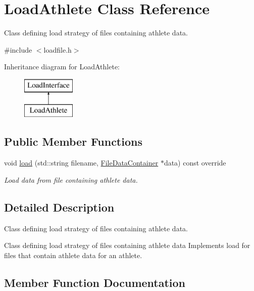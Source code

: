 \hypertarget{classLoadAthlete}{}\section{Load\+Athlete Class Reference}
\label{classLoadAthlete}


Class defining load strategy of files containing athlete data.  




{\ttfamily \#include $<$loadfile.\+h$>$}

Inheritance diagram for Load\+Athlete\+:\begin{figure}[H]
\begin{center}
\leavevmode
\includegraphics[height=2.000000cm]{classLoadAthlete}
\end{center}
\end{figure}
\subsection*{Public Member Functions}
\begin{DoxyCompactItemize}
\item 
void \mbox{\hyperlink{classLoadAthlete_a27b179d1707fe253ae506a97b112eac0}{load}} (std\+::string filename, \mbox{\hyperlink{classFileDataContainer}{File\+Data\+Container}} $\ast$data) const override
\begin{DoxyCompactList}\small\item\em Load data from file containing athlete data. \end{DoxyCompactList}\end{DoxyCompactItemize}


\subsection{Detailed Description}
Class defining load strategy of files containing athlete data. 

Class defining load strategy of files containing athlete data Implements load for files that contain athlete data for an athlete. 

\subsection{Member Function Documentation}
\mbox{\label{classLoadAthlete_a27b179d1707fe253ae506a97b112eac0}} 
